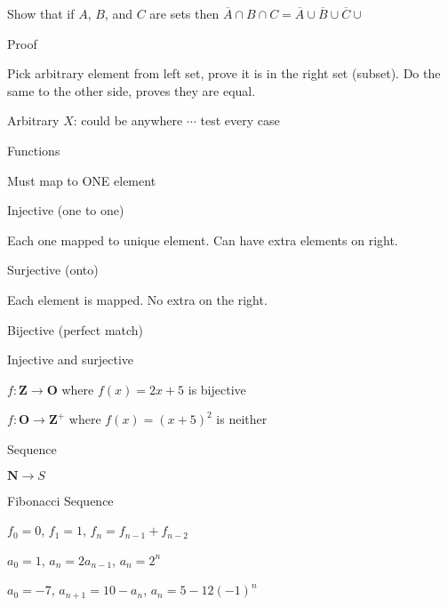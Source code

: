 \begin{prob}

Show that if $A$, $B$, and $C$ are sets then ${\overline A \cap B \cap C} = {\overline A} \cup {\overline B} \cup {\overline C} \cup$

\end{prob}

Proof

Pick arbitrary element from left set, prove it is in the right set (subset). Do the same to the other side, proves they are equal.

Arbitrary $X$: could be anywhere $\cdots$ test every case

Functions

Must map to ONE element

Injective (one to one)

Each one mapped to unique element. Can have extra elements on right.

Surjective (onto)

Each element is mapped. No extra on the right.

Bijective (perfect match)

Injective and surjective

\begin{prob}

$f: \mathbf{Z} \rightarrow \mathbf{O}$ where $f(x) = 2x + 5$ is bijective

\end{prob}

\begin{prob}

$f: \mathbf{O} \rightarrow \mathbf{Z}^{+}$ where $f(x) = (x + 5)^2$ is neither

\end{prob}

Sequence

$\mathbf{N} \rightarrow S$

Fibonacci Sequence

$f_0 = 0$, $f_1 = 1$, $f_n = f_{n - 1} + f_{n - 2}$

\begin{prob}

$a_0 = 1$, $a_n = 2a_{n - 1}$, $a_n = 2^n$

\end{prob}

\begin{prob}

$a_0 = -7$, $a_{n + 1} = 10 - a_n$, $a_n = 5 - 12 (-1)^n$

\end{prob}



